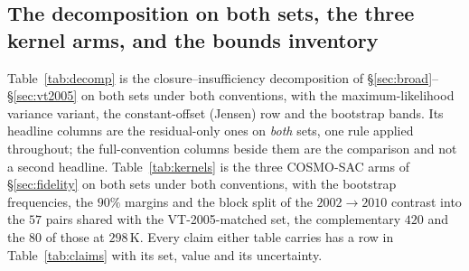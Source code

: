 \subsection{The decomposition on both sets, the three kernel arms, and the bounds inventory}
\label{sec:si-decomp-arms}
Table~\ref{tab:decomp} is the closure--insufficiency decomposition of \S\ref{sec:broad}--\S\ref{sec:vt2005}
on both sets under both conventions, with the maximum-likelihood variance variant, the
constant-offset (Jensen) row and the bootstrap bands. Its headline columns are the residual-only
ones on \emph{both} sets, one rule applied throughout; the full-convention columns beside them are
the comparison and not a second headline. Table~\ref{tab:kernels} is the three
COSMO-SAC arms of \S\ref{sec:fidelity} on both sets under both conventions, with the
bootstrap frequencies, the $90\%$ margins and the block split of the $2002\to2010$ contrast into
the $57$ pairs shared with the VT-2005-matched set, the complementary $420$ and the $80$ of those at
$298$\,K. Every claim either table carries has a row in Table~\ref{tab:claims} with its set,
value and its uncertainty.


